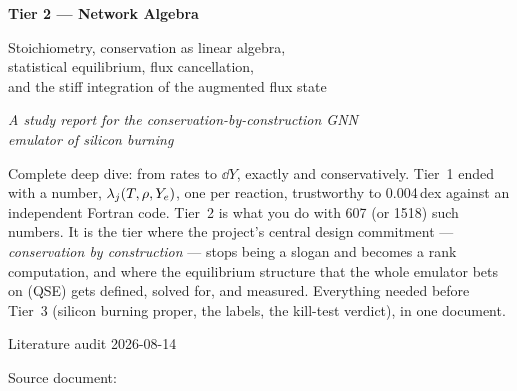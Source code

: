 
\begin{titlepage}
\centering
\vspace*{3.2cm}

{\Huge\bfseries Tier 2 --- Network Algebra\par}

\vspace{1.2em}
{\Large Stoichiometry, conservation as linear algebra,\\[0.3em]
statistical equilibrium, flux cancellation,\\[0.3em]
and the stiff integration of the augmented flux state\par}

\vspace{0.8em}
{\large\itshape A study report for the conservation-by-construction GNN\\
emulator of silicon burning\par}

\vspace{2.6em}
\begin{minipage}{0.84\textwidth}
\small
Complete deep dive: from rates to $\dd Y$, exactly and conservatively. Tier~1
ended with a number, $\lambda_j(T, \rho, Y_{e})$, one per reaction, trustworthy to
0.004\,dex against an independent Fortran code. Tier~2 is what you do with 607
(or 1518) such numbers. It is the tier where the project's central design
commitment --- \emph{conservation by construction} --- stops being a slogan and
becomes a rank computation, and where the equilibrium structure that the whole
emulator bets on (QSE) gets defined, solved for, and measured. Everything
needed before Tier~3 (silicon burning proper, the labels, the kill-test
verdict), in one document.
\end{minipage}

\vfill
{\small Literature audit 2026-08-14\par}
\vspace{0.5em}
{\small Source document: \par}
\end{titlepage}

